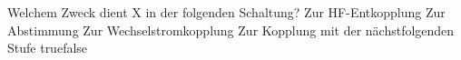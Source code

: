     {Welchem Zweck dient X in der folgenden Schaltung?}
    {Zur HF-Entkopplung}
    {Zur Abstimmung}
    {Zur Wechselstromkopplung}
    {Zur Kopplung mit der nächstfolgenden Stufe}
    {true}{false}